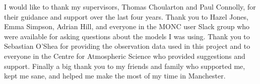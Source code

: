 \documentclass[12pt,PhD,twoside]{muthesis}
\numberwithin{equation}{chapter}														 %
\begin{document}
\afterabstract

	I would like to thank my supervisors, Thomas Choularton and Paul Connolly, for their guidance and support over the last four years. Thank you to Hazel Jones, Emma Simpson, Adrian Hill, and everyone in the MONC user Slack group who were available for asking questions about the models I was using. Thank you to Sebastian O'Shea for providing the observation data used in this project and to everyone in the Centre for Atmospheric Science who provided suggestions and support. Finally a big thank you to my friends and family who supported me, kept me sane, and helped me make the most of my time in Manchester.


\afterpreface

\raggedright          																					%



%
%
%




%
%

%









\end{document}
